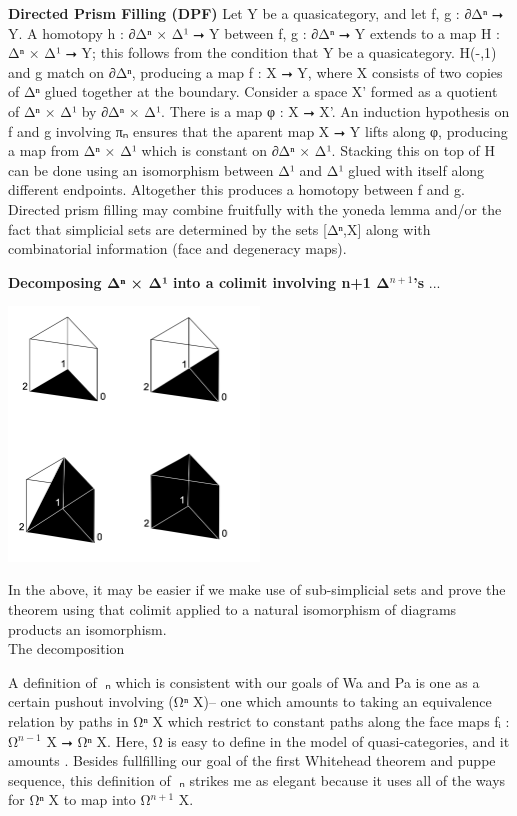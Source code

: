 \documentclass{book}
\theoremstyle{definition}
\begin{document}
{\bf Directed Prism Filling (DPF)} Let Y be a quasicategory, and let f, g : ∂Δⁿ ⭢ Y. A homotopy h : ∂Δⁿ × Δ¹ ⭢ Y between f, g : ∂Δⁿ ⭢ Y extends to a map H : Δⁿ × Δ¹ ⭢ Y; this follows from the condition that Y be a quasicategory. H(-,1) and g match on ∂Δⁿ, producing a map f : X ⭢ Y, where X consists of two copies of Δⁿ glued together at the boundary. Consider a space X' formed as a quotient of Δⁿ × Δ¹ by ∂Δⁿ × Δ¹. There is a map φ : X ⭢ X'. An induction hypothesis on f and g involving πₙ ensures that the aparent map X ⭢ Y lifts along φ, producing a map from Δⁿ × Δ¹ which is constant on ∂Δⁿ × Δ¹. Stacking this on top of H can be done using an isomorphism between Δ¹ and Δ¹ glued with itself along different endpoints. Altogether this produces a homotopy between f and g.\\

Directed prism filling may combine fruitfully with the yoneda lemma and/or the fact that simplicial sets are determined by the sets [Δⁿ,X] along with combinatorial information (face and degeneracy maps).

{\bf Decomposing Δⁿ × Δ¹ into a colimit involving n+1 Δ${}^{n+1}$'s} ...

\begin{center}
\includegraphics[width=0.5\textwidth]{prismfilling.png}
\end{center}

In the above, it may be easier if we make use of sub-simplicial sets and prove the theorem using that colimit applied to a natural isomorphism of diagrams products an isomorphism.\\

The decomposition 

A definition of π⃗ₙ which is consistent with our goals of Wa and Pa is one as a certain pushout involving (Ω⃗ⁿ X)-- one which amounts to taking an equivalence relation by paths in Ω⃗ⁿ X which restrict to constant paths along the face maps fᵢ : Ω⃗${}^{n-1}$ X ⭢ Ω⃗ⁿ X. Here, Ω⃗ is easy to define in the model of quasi-categories, and it amounts . Besides fullfilling our goal of the first Whitehead theorem and puppe sequence, this definition of π⃗ₙ strikes me as elegant because it uses all of the ways for Ω⃗ⁿ X to map into Ω⃗${}^{n+1}$ X.\\
\end{document}
